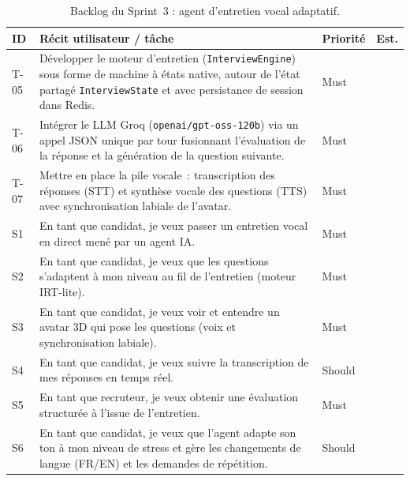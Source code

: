 \begin{table}[H]
  \centering
  \footnotesize
  \renewcommand{\arraystretch}{1.3}
  \setlength{\tabcolsep}{5pt}
  \begin{tabularx}{\textwidth}{|>{\centering\arraybackslash}p{1.1cm}|>{\raggedright\arraybackslash}X|>{\centering\arraybackslash}p{1.7cm}|>{\centering\arraybackslash}p{0.9cm}|}
    \hline
    \rowcolor{blue!10}
    \textbf{ID} & \textbf{Récit utilisateur / tâche} & \textbf{Priorité} & \textbf{Est.} \\
    \hline
    T-05 & Développer le moteur d'entretien (\texttt{InterviewEngine}) sous forme de machine à états native, autour de l'état partagé \texttt{InterviewState} et avec persistance de session dans Redis. & Must & 13 \\
    \hline
    T-06 & Intégrer le LLM Groq (\texttt{openai/gpt-oss-120b}) via un appel JSON unique par tour fusionnant l'évaluation de la réponse et la génération de la question suivante. & Must & 8 \\
    \hline
    T-07 & Mettre en place la pile vocale~: transcription des réponses (STT) et synthèse vocale des questions (TTS) avec synchronisation labiale de l'avatar. & Must & 8 \\
    \hline
    S1 & En tant que candidat, je veux passer un entretien vocal en direct mené par un agent IA. & Must & 8 \\
    \hline
    S2 & En tant que candidat, je veux que les questions s'adaptent à mon niveau au fil de l'entretien (moteur IRT-lite). & Must & 8 \\
    \hline
    S3 & En tant que candidat, je veux voir et entendre un avatar 3D qui pose les questions (voix et synchronisation labiale). & Must & 8 \\
    \hline
    S4 & En tant que candidat, je veux suivre la transcription de mes réponses en temps réel. & Should & 5 \\
    \hline
    S5 & En tant que recruteur, je veux obtenir une évaluation structurée à l'issue de l'entretien. & Must & 5 \\
    \hline
    S6 & En tant que candidat, je veux que l'agent adapte son ton à mon niveau de stress et gère les changements de langue (FR/EN) et les demandes de répétition. & Should & 5 \\
    \hline
  \end{tabularx}
  \caption{Backlog du Sprint~3 : agent d'entretien vocal adaptatif.}
  \label{tab:backlog-s3}
\end{table}


